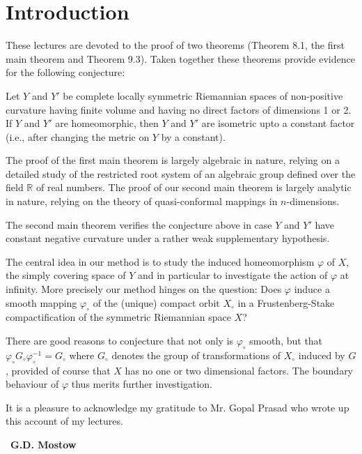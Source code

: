 \chapter*{Introduction}


These lectures are devoted to the proof of two theorems (Theorem 8.1,
the first main theorem and Theorem 9.3). Taken together these theorems
provide evidence for the following conjecture:

Let $Y$ and $Y'$ be complete locally symmetric Riemannian spaces of
non-positive curvature having finite volume and having no direct
factors of dimensions 1 or 2. If $Y$ and $Y'$ are homeomorphic, then
$Y$ and $Y'$ are isometric upto a constant factor (i.e., after
changing the metric on $Y$ by a constant).

The proof of the first main theorem is largely algebraic in nature,
relying on a detailed study of the restricted root system of an
algebraic group defined over the field $\mathbb{R}$ of real
numbers. The proof of our second main theorem is largely analytic in
nature, relying on the theory of quasi-conformal mappings in
$n$-dimensions.

The second main theorem verifies the conjecture above in case $Y$ and
$Y'$ have constant negative curvature under a rather weak
supplementary hypothesis.

The central idea in our method is to study the induced homeomorphism
$\varphi$ of $X$, the simply covering space of $Y$ and in particular
to investigate the action of $\varphi$ at infinity. More precisely
our method hinges on the question: Does $\varphi$ induce a smooth
mapping $\varphi_\circ$ of the (unique) compact orbit $X_\circ$ in a
Frustenberg-Stake compactification of the symmetric Riemannian space
$X$?

There are good reasons to conjecture that not only is $\varphi_\circ$
smooth, but that $\varphi_\circ G_\circ \varphi_\circ^{-1}= G_\circ$
where $G_\circ$ denotes the group of transformations of $X_\circ$
induced by $G$, provided of course that $X$ has no one or two
dimensional factors. The boundary behaviour of $\varphi$ thus merits
further investigation.

It is a pleasure to acknowledge my gratitude to Mr. Gopal Prasad who
wrote up this account of my lectures.

\bigskip
~\hfill {\large\bf G.D. Mostow}
